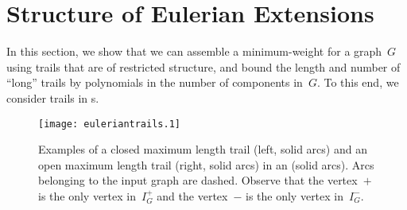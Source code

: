 \section{Structure of Eulerian Extensions}
\label{sec:trails}

In this section, we show that we can assemble a minimum-weight \EE{} for a graph~$G$ using trails that are of restricted structure, and bound the length and number of ``long'' trails by polynomials in the number of components in~$G$. To this end, we consider trails in \EE s. 
\begin{figure}
  \begin{center}
    \texttt{[image: euleriantrails.1]}
    \caption{Examples of a closed maximum length trail (left, solid arcs) and an open maximum length trail (right, solid arcs) in an \EE{} (solid arcs). Arcs belonging to the input graph are dashed. Observe that the vertex~$+$ is the only vertex in~$I_G^+$ and the vertex~$-$ is the only vertex in~$I_G^-$.}
    \label{fig:pmetrails}
  \end{center}
\end{figure}

